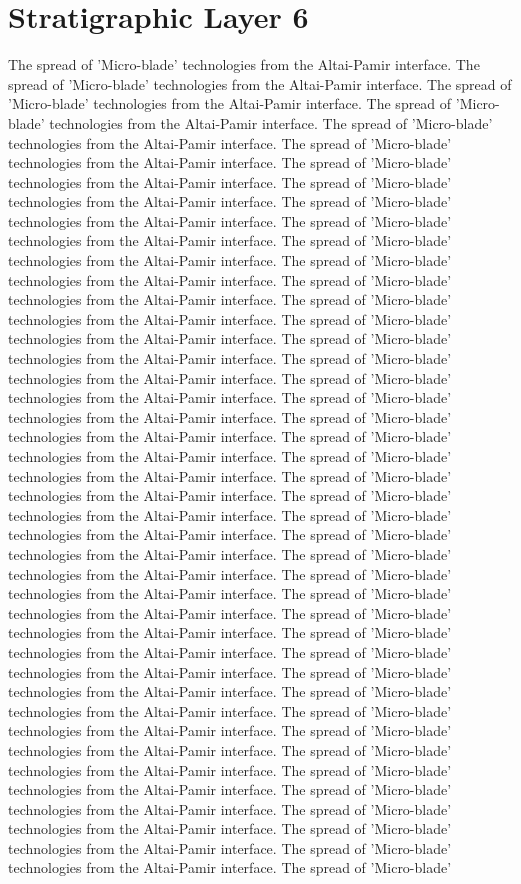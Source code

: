 \section{Stratigraphic Layer 6}
The spread of 'Micro-blade' technologies from the Altai-Pamir interface. The spread of 'Micro-blade' technologies from the Altai-Pamir interface. The spread of 'Micro-blade' technologies from the Altai-Pamir interface. The spread of 'Micro-blade' technologies from the Altai-Pamir interface. The spread of 'Micro-blade' technologies from the Altai-Pamir interface. The spread of 'Micro-blade' technologies from the Altai-Pamir interface. The spread of 'Micro-blade' technologies from the Altai-Pamir interface. The spread of 'Micro-blade' technologies from the Altai-Pamir interface. The spread of 'Micro-blade' technologies from the Altai-Pamir interface. The spread of 'Micro-blade' technologies from the Altai-Pamir interface. The spread of 'Micro-blade' technologies from the Altai-Pamir interface. The spread of 'Micro-blade' technologies from the Altai-Pamir interface. The spread of 'Micro-blade' technologies from the Altai-Pamir interface. The spread of 'Micro-blade' technologies from the Altai-Pamir interface. The spread of 'Micro-blade' technologies from the Altai-Pamir interface. The spread of 'Micro-blade' technologies from the Altai-Pamir interface. The spread of 'Micro-blade' technologies from the Altai-Pamir interface. The spread of 'Micro-blade' technologies from the Altai-Pamir interface. The spread of 'Micro-blade' technologies from the Altai-Pamir interface. The spread of 'Micro-blade' technologies from the Altai-Pamir interface. The spread of 'Micro-blade' technologies from the Altai-Pamir interface. The spread of 'Micro-blade' technologies from the Altai-Pamir interface. The spread of 'Micro-blade' technologies from the Altai-Pamir interface. The spread of 'Micro-blade' technologies from the Altai-Pamir interface. The spread of 'Micro-blade' technologies from the Altai-Pamir interface. The spread of 'Micro-blade' technologies from the Altai-Pamir interface. The spread of 'Micro-blade' technologies from the Altai-Pamir interface. The spread of 'Micro-blade' technologies from the Altai-Pamir interface. The spread of 'Micro-blade' technologies from the Altai-Pamir interface. The spread of 'Micro-blade' technologies from the Altai-Pamir interface. The spread of 'Micro-blade' technologies from the Altai-Pamir interface. The spread of 'Micro-blade' technologies from the Altai-Pamir interface. The spread of 'Micro-blade' technologies from the Altai-Pamir interface. The spread of 'Micro-blade' technologies from the Altai-Pamir interface. The spread of 'Micro-blade' technologies from the Altai-Pamir interface. The spread of 'Micro-blade' technologies from the Altai-Pamir interface. The spread of 'Micro-blade' technologies from the Altai-Pamir interface. The spread of 'Micro-blade' technologies from the Altai-Pamir interface. The spread of 'Micro-blade' technologies from the Altai-Pamir interface. The spread of 'Micro-blade' technologies from the Altai-Pamir interface. The spread of 'Micro-blade' technologies from the Altai-Pamir interface. The spread of 'Micro-blade' technologies from the Altai-Pamir interface. The spread of 'Micro-blade' 